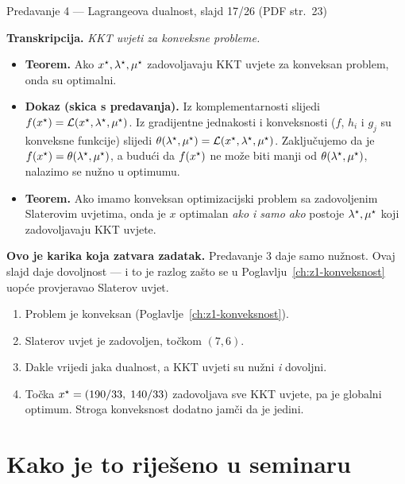 \begin{izvor}{Predavanje 4 --- Lagrangeova dualnost, slajd 17/26 (PDF str.~23)}

\textbf{Transkripcija.} \emph{KKT uvjeti za konveksne probleme.}
\begin{itemize}[nosep,leftmargin=*]
  \item \textbf{Teorem.} Ako $x^{\star}, \lambda^{\star}, \mu^{\star}$ zadovoljavaju KKT
        uvjete za konveksan problem, onda su optimalni.
  \item \textbf{Dokaz (skica s predavanja).} Iz komplementarnosti slijedi
        $f(x^{\star}) = \mathcal{L}(x^{\star}, \lambda^{\star}, \mu^{\star})$. Iz gradijentne
        jednakosti i konveksnosti ($f$, $h_i$ i $g_j$ su konveksne funkcije)
        slijedi $\theta(\lambda^{\star}, \mu^{\star}) = \mathcal{L}(x^{\star}, \lambda^{\star}, \mu^{\star})$.
        Zaključujemo da je $f(x^{\star}) = \theta(\lambda^{\star}, \mu^{\star})$, a budući da
        $f(x^{\star})$ ne može biti manji od $\theta(\lambda^{\star}, \mu^{\star})$, nalazimo
        se nužno u optimumu.
  \item \textbf{Teorem.} Ako imamo konveksan optimizacijski problem sa
        zadovoljenim Slaterovim uvjetima, onda je $x$ optimalan \emph{ako i samo
        ako} postoje $\lambda^{\star}, \mu^{\star}$ koji zadovoljavaju KKT uvjete.
\end{itemize}

\textbf{Ovo je karika koja zatvara zadatak.} Predavanje 3 daje samo nužnost.
Ovaj slajd daje dovoljnost --- i to je razlog zašto se u
Poglavlju~\ref{ch:z1-konveksnost} uopće provjeravao Slaterov uvjet.
\end{izvor}

\begin{korak}
\begin{enumerate}[leftmargin=*]
  \item Problem je konveksan (Poglavlje~\ref{ch:z1-konveksnost}).
  \item Slaterov uvjet je zadovoljen, točkom $(7,6)$.
  \item Dakle vrijedi jaka dualnost, a KKT uvjeti su nužni \emph{i} dovoljni.
  \item Točka $x^{\star} = (190/33,\; 140/33)$ zadovoljava sve KKT uvjete, pa je
        globalni optimum. Stroga konveksnost dodatno jamči da je jedini.
\end{enumerate}
\end{korak}

\section{Kako je to riješeno u seminaru}
\label{sec:z1b-seminar}

